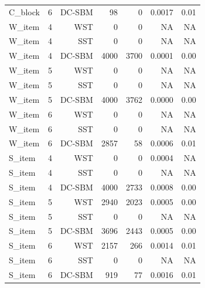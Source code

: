 \begin{table}[!h]
\begin{tabular}[t]{lrrrrrr}
C_block & 6 & DC-SBM & 98 & 0 & 0.0017 & 0.01\\
W_item & 4 & WST & 0 & 0 & NA & NA\\
W_item & 4 & SST & 0 & 0 & NA & NA\\
W_item & 4 & DC-SBM & 4000 & 3700 & 0.0001 & 0.00\\
W_item & 5 & WST & 0 & 0 & NA & NA\\
W_item & 5 & SST & 0 & 0 & NA & NA\\
W_item & 5 & DC-SBM & 4000 & 3762 & 0.0000 & 0.00\\
W_item & 6 & WST & 0 & 0 & NA & NA\\
W_item & 6 & SST & 0 & 0 & NA & NA\\
W_item & 6 & DC-SBM & 2857 & 58 & 0.0006 & 0.01\\
S_item & 4 & WST & 0 & 0 & 0.0004 & NA\\
S_item & 4 & SST & 0 & 0 & NA & NA\\
S_item & 4 & DC-SBM & 4000 & 2733 & 0.0008 & 0.00\\
S_item & 5 & WST & 2940 & 2023 & 0.0005 & 0.00\\
S_item & 5 & SST & 0 & 0 & NA & NA\\
S_item & 5 & DC-SBM & 3696 & 2443 & 0.0005 & 0.00\\
S_item & 6 & WST & 2157 & 266 & 0.0014 & 0.01\\
S_item & 6 & SST & 0 & 0 & NA & NA\\
S_item & 6 & DC-SBM & 919 & 77 & 0.0016 & 0.01\\
\bottomrule
\end{tabular}
\end{table}

